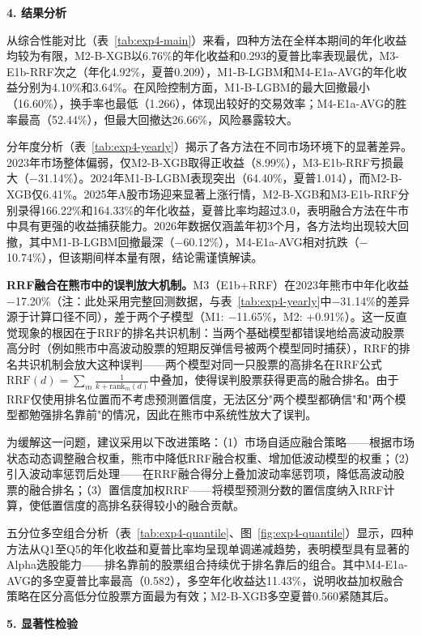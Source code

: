\documentclass[11pt,a4paper]{ctexart}
\begin{document}
\textbf{4. 结果分析}

从综合性能对比（表~\ref{tab:exp4-main}）来看，四种方法在全样本期间的年化收益均较为有限，M2-B-XGB以6.76\%的年化收益和0.293的夏普比率表现最优，M3-E1b-RRF次之（年化4.92\%，夏普0.209），M1-B-LGBM和M4-E1a-AVG的年化收益分别为4.10\%和3.64\%。在风险控制方面，M1-B-LGBM的最大回撤最小（16.60\%），换手率也最低（1.266），体现出较好的交易效率；M4-E1a-AVG的胜率最高（52.44\%），但最大回撤达26.66\%，风险暴露较大。

分年度分析（表~\ref{tab:exp4-yearly}）揭示了各方法在不同市场环境下的显著差异。2023年市场整体偏弱，仅M2-B-XGB取得正收益（8.99\%），M3-E1b-RRF亏损最大（$-$31.14\%）。2024年M1-B-LGBM表现突出（64.40\%，夏普1.014），而M2-B-XGB仅6.41\%。2025年A股市场迎来显著上涨行情，M2-B-XGB和M3-E1b-RRF分别录得166.22\%和164.33\%的年化收益，夏普比率均超过3.0，表明融合方法在牛市中具有更强的收益捕获能力。2026年数据仅涵盖年初3个月，各方法均出现较大回撤，其中M1-B-LGBM回撤最深（$-$60.12\%），M4-E1a-AVG相对抗跌（$-$10.74\%），但该期间样本量有限，结论需谨慎解读。

\textbf{RRF融合在熊市中的误判放大机制。}M3（E1b+RRF）在2023年熊市中年化收益$-$17.20\%（注：此处采用完整回测数据，与表~\ref{tab:exp4-yearly}中$-$31.14\%的差异源于计算口径不同），差于两个子模型（M1: $-$11.65\%，M2: +0.91\%）。这一反直觉现象的根因在于RRF的排名共识机制：当两个基础模型都错误地给高波动股票高分时（例如熊市中高波动股票的短期反弹信号被两个模型同时捕获），RRF的排名共识机制会放大这种误判——两个模型对同一只股票的高排名在RRF公式$\text{RRF}(d) = \sum_{m} \frac{1}{k + \text{rank}_m(d)}$中叠加，使得误判股票获得更高的融合排名。由于RRF仅使用排名位置而不考虑预测置信度，无法区分"两个模型都确信"和"两个模型都勉强排名靠前"的情况，因此在熊市中系统性放大了误判。

为缓解这一问题，建议采用以下改进策略：（1）市场自适应融合策略——根据市场状态动态调整融合权重，熊市中降低RRF融合权重、增加低波动模型的权重；（2）引入波动率惩罚后处理——在RRF融合得分上叠加波动率惩罚项，降低高波动股票的融合排名；（3）置信度加权RRF——将模型预测分数的置信度纳入RRF计算，使低置信度的高排名获得较小的融合贡献。

五分位多空组合分析（表~\ref{tab:exp4-quantile}、图~\ref{fig:exp4-quantile}）显示，四种方法从Q1至Q5的年化收益和夏普比率均呈现单调递减趋势，表明模型具有显著的Alpha选股能力——排名靠前的股票组合持续优于排名靠后的组合。其中M4-E1a-AVG的多空夏普比率最高（0.582），多空年化收益达11.43\%，说明收益加权融合策略在区分高低分位股票方面最为有效；M2-B-XGB多空夏普0.560紧随其后。

\textbf{5. 显著性检验}
\end{document}
